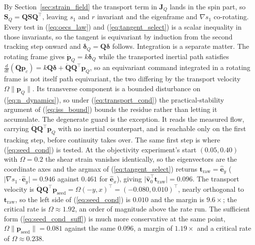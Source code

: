 \documentclass[lettersize,journal]{IEEEtran}
\begin{document}
\begin{IEEEproof}
By Section~\ref{sec:strain_field} the transport term in $\mathbf{J}_Q$ lands in the
spin part, so $\mathbf{S}_Q = \mathbf{Q}\mathbf{S}\mathbf{Q}^\top$,
leaving $s_1$ and $r$ invariant and the eigenframe and $\nabla s_1$
co-rotating. Every test in (\ref{eq:oecs_law}) and
(\ref{eq:tangent_select}) is a scalar inequality in those invariants, so
the tangent is equivariant by induction from the second tracking step
onward and $\boldsymbol{\delta}_Q = \mathbf{Q}\boldsymbol{\delta}$
follows. Integration is a separate matter. The rotating frame gives
$\dot{\mathbf{p}}_Q = k\boldsymbol{\delta}_Q$ while the transported
inertial path satisfies $\tfrac{d}{dt}(\mathbf{Q}\mathbf{p}_c) =
k\mathbf{Q}\boldsymbol{\delta} +
\dot{\mathbf{Q}}\mathbf{Q}^\top\mathbf{p}_Q$, so an equivariant command
integrated in a rotating frame is not itself path equivariant, the two
differing by the transport velocity $\Omega\lVert\mathbf{p}_Q\rVert$.
Its transverse component is a bounded disturbance on
(\ref{eq:n_dynamics}), so under (\ref{eq:transport_cond}) the
practical-stability argument of (\ref{eq:iss_bound}) bounds the residue
rather than letting it accumulate. The degenerate guard is the exception.
It reads the
measured flow, carrying
$\dot{\mathbf{Q}}\mathbf{Q}^\top\mathbf{p}_Q$ with no inertial
counterpart, and is reachable only on the first tracking step, before
continuity takes over. The same first step is where
(\ref{eq:seed_cond}) is tested. At the objectivity experiment's start
$(0.05, 0.40)$ with $\Omega = 0.2$ the shear strain vanishes
identically, so the eigenvectors are the coordinate axes and the argmax
of (\ref{eq:tangent_select}) returns $\mathbf{t}_{\text{raw}} =
\hat{\mathbf{e}}_y$ ($\lvert\nabla s_1 \cdot \hat{\mathbf{e}}_y\rvert =
0.946$ against $0.461$ for $\hat{\mathbf{e}}_x$), giving
$\lvert\hat{\mathbf{v}}_0^\top\mathbf{t}_{\text{raw}}\rvert = 0.096$.
The transport velocity is
$\dot{\mathbf{Q}}\mathbf{Q}^\top\mathbf{p}_{\text{seed}} = \Omega(-y,
x)^\top = (-0.080, 0.010)^\top$, nearly orthogonal to
$\mathbf{t}_{\text{raw}}$, so the left side of (\ref{eq:seed_cond}) is
$0.010$ and the margin is $9.6\times$; the critical rate is
$\Omega \approx 1.92$, an order of magnitude above the rate run. The
sufficient form (\ref{eq:seed_cond_suff}) is much more conservative at
the same point, $\Omega\lVert\mathbf{p}_{\text{seed}}\rVert = 0.081$
against the same $0.096$, a margin of $1.19\times$ and a critical rate
of $\Omega \approx 0.238$.
\end{IEEEproof}
\end{document}
